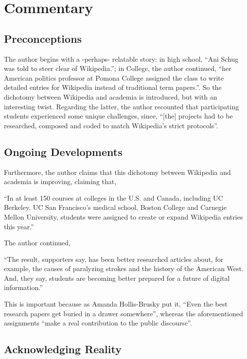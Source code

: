 \section{Commentary}



\subsection{Preconceptions}

The author begins with a -perhaps- relatable story: in high school, ``Ani Schug was told to steer clear of Wikipedia.''; in College, the author continued, ``her American politics professor at Pomona College assigned the class to write detailed entries for Wikipedia instead of traditional term papers.''. So the dichotomy between Wikipedia and academia is introduced, but with an interesting twist. Regarding the latter, the author recounted that participating students experienced some unique challenges, since, ``[the] projects had to be researched, composed and coded to match Wikipedia’s strict protocols''.



\subsection{Ongoing Developments}

Furthermore, the author claims that this dichotomy between Wikipedia and academia is improving, claiming that,

``In at least 150 courses at colleges in the U.S. and Canada, including UC Berkeley, UC San Francisco’s medical school, Boston College and Carnegie Mellon University, students were assigned to create or expand Wikipedia entries this year.''

The author continued,

``The result, supporters say, has been better researched articles about, for example, the causes of paralyzing strokes and the history of the American West. And, they say, students are becoming better prepared for a future of digital information.''

This is important because as Amanda Hollis-Brusky put it, ``Even the best research papers get buried in a drawer somewhere'', whereas the aforementioned assignments ``make a real contribution to the public discourse''.



\subsection{Acknowledging Reality}

